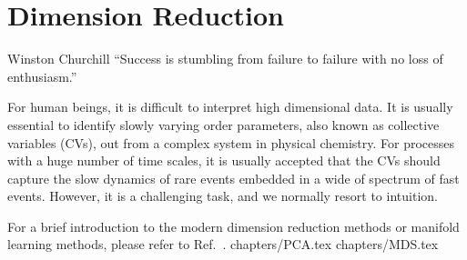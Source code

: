 \chapter{Dimension Reduction\label{chapter:DR}}
\begin{chapquote}{Winston Churchill%
	}
	``Success is stumbling from failure to failure with no loss of enthusiasm.''
\end{chapquote}
For human beings, it is difficult to interpret high dimensional data. It is usually essential to identify slowly varying order parameters, also known as collective variables (CVs), out from a complex system in physical chemistry. For processes with a huge number of time scales, it is usually accepted that the CVs should capture the slow dynamics of rare events embedded in a wide of spectrum of fast events. However, it is a challenging task, and we normally resort to intuition.

For a brief introduction to the modern dimension reduction methods or manifold learning methods, please refer to Ref.~\cite{IzamanWIREsCS2012}.
\clearpage 
 {chapters/PCA.tex}
\clearpage
 {chapters/MDS.tex}

